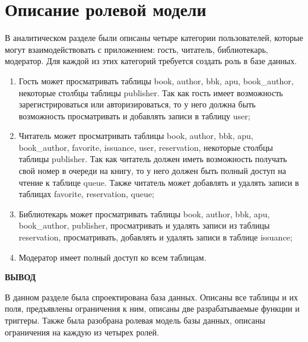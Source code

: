 \section{Описание ролевой модели}
В аналитическом разделе были описаны четыре категории пользователей, которые могут взаимодействовать с приложением: гость, читатель, библиотекарь, модератор. Для каждой из этих категорий требуется создать роль в базе данных.
\begin{enumerate}
    \item Гость может просматривать таблицы book, author, bbk, apu, book\_author, некоторые столбцы таблицы publisher. Так как гость имеет возможность зарегистрироваться или авторизироваться, то у него должна быть возможность просматривать и добавлять записи в таблицу user;
    \item Читатель может просматривать таблицы book, author, bbk, apu, book\_author, favorite, issuance, user, reservation, некоторые столбцы таблицы publisher. Так как читатель должен иметь возможность получать свой номер в очереди на книгу, то у него должен быть полный доступ на чтение к таблице queue. Также читатель может добавлять и удалять записи в таблицах favorite, reservation, queue;
    \item Библиотекарь может просматривать таблицы book, author, bbk, apu, book\_author, publisher, просматривать и удалять записи из таблицы reservation, просматривать, добавлять и удалять записи в таблице issuance;
    \item Модератор имеет полный доступ ко всем таблицам. 
\end{enumerate}

\textbf{ВЫВОД}

В данном разделе была спроектирована база данных. Описаны все таблицы и их поля, предъявлены ограничения к ним, описаны две разрабатываемые функции и триггеры. Также была разобрана ролевая модель базы данных, описаны ограничения на каждую из четырех ролей.

\clearpage